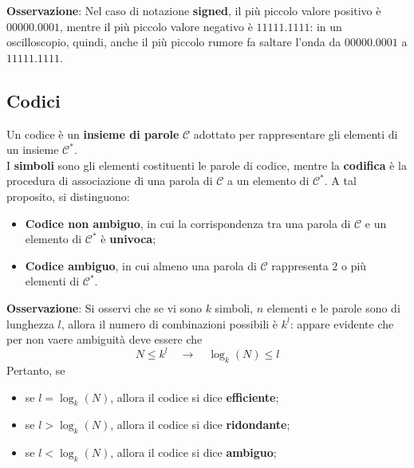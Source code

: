 \documentclass[a4paper]{extarticle}
\begin{document}
\vspace{1em}
\noindent
\textbf{Osservazione}: Nel caso di notazione \textbf{signed}, il più piccolo valore positivo è $00000.0001$, mentre il più piccolo valore negativo è $11111.1111$: in un oscilloscopio, quindi, anche il più piccolo rumore fa saltare l'onda da $00000.0001$ a $11111.1111$.

\vspace{1em}
\subsection{Codici}
Un codice è un \textbf{insieme di parole} $\mathcal{C}$ adottato per rappresentare gli elementi di un insieme $\mathcal{C}^*$.\\
I \textbf{simboli} sono gli elementi costituenti le parole di codice, mentre la \textbf{codifica} è la procedura di associazione di una parola di $\mathcal{C}$ a un elemento di $\mathcal{C}^*$. A tal proposito, si distinguono:
\begin{itemize}
    \item \textbf{Codice non ambiguo}, in cui la corrispondenza tra una parola di $\mathcal{C}$ e un elemento di $\mathcal{C}^*$ è \textbf{univoca};
    \item \textbf{Codice ambiguo}, in cui almeno una parola di $\mathcal{C}$ rappresenta $2$ o più elementi di $\mathcal{C}^*$.
\end{itemize}

\vspace{1em}
\noindent
\textbf{Osservazione}: Si osservi che se vi sono $k$ simboli, $n$ elementi e le parole sono di lunghezza $l$, allora il numero di combinazioni possibili è $k^l$: appare evidente che per non vaere ambiguità deve essere che
\[N \leq k^l \hspace{1em} \rightarrow \hspace{1em} \log_k(N) \leq l\]
Pertanto, se
\begin{itemize}
    \item se $l=\log_k(N)$, allora il codice si dice \textbf{efficiente};
    \item se $l>\log_k(N)$, allora il codice si dice \textbf{ridondante};
    \item se $l<\log_k(N)$, allora il codice si dice \textbf{ambiguo};
\end{itemize}


\vspace{1em}
\noindent
\end{document}
